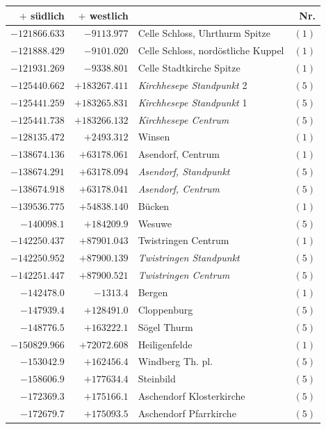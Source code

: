 \clearpage{}%
\begin{center}\begingroup\fontsize{8}{9}\selectfont
\setlength{\tabcolsep}{4pt}
\begin{tabular}{r|r|p{170pt}|r}\hline
\(+\) südlich&\(+\) westlich&&Nr.\\\hline
\(-121866.633\)&\(-9113.977\)&Celle Schloss, Uhrthurm Spitze&\((1)\)\\
\(-121888.429\)&\(-9101.020\)&Celle Schloss, nordöstliche Kuppel&\((1)\)\\
\(-121931.269\)&\(-9338.801\)&Celle Stadtkirche Spitze&\((1)\)\\
\(-125440.662\)&\(+183267.411\)&\textit{Kirchhesepe Standpunkt} 2&\((5)\)\\
\(-125441.259\)&\(+183265.831\)&\textit{Kirchhesepe Standpunkt} 1&\((5)\)\\
\(-125441.738\)&\(+183266.132\)&\textit{Kirchhesepe Centrum}&\((5)\)\\
\(-128135.472\)&\(+2493.312\)&Winsen&\((1)\)\\
\(-138674.136\)&\(+63178.061\)&Asendorf, Centrum&\((1)\)\\
\(-138674.291\)&\(+63178.094\)&\textit{Asendorf, Standpunkt}&\((5)\)\\
\(-138674.918\)&\(+63178.041\)&\textit{Asendorf, Centrum}&\((5)\)\\
\(-139536.775\)&\(+54838.140\)&Bücken&\((1)\)\\
\(-140098.1\)&\(+184209.9\)&Wesuwe&\((5)\)\\
\(-142250.437\)&\(+87901.043\)&Twistringen Centrum&\((1)\)\\
\(-142250.952\)&\(+87900.139\)&\textit{Twistringen Standpunkt}&\((5)\)\\
\(-142251.447\)&\(+87900.521\)&\textit{Twistringen Centrum}&\((5)\)\\
\(-142478.0\)&\(-1313.4\)&Bergen&\((1)\)\\
\(-147939.4\)&\(+128491.0\)&Cloppenburg&\((5)\)\\
\(-148776.5\)&\(+163222.1\)&Sögel Thurm&\((5)\)\\
\(-150829.966\)&\(+72072.608\)&Heiligenfelde&\((1)\)\\
\(-153042.9\)&\(+162456.4\)&Windberg Th. pl.&\((5)\)\\
\(-158606.9\)&\(+177634.4\)&Steinbild&\((5)\)\\
\(-172369.3\)&\(+175166.1\)&Aschendorf Klosterkirche&\((5)\)\\
\(-172679.7\)&\(+175093.5\)&Aschendorf Pfarrkirche&\((5)\)\\

\end{tabular}
\end{center}
